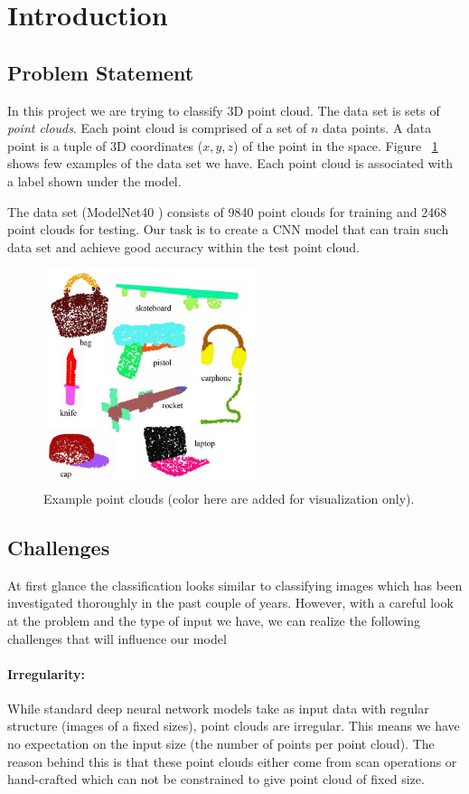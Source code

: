 \section{Introduction} 
\subsection{Problem Statement}

In this project we are trying to classify 3D point cloud. The data set is sets of \emph{point clouds}. Each point cloud is comprised of a set of $n$ data points. A data point is a tuple of 3D coordinates ($x,y,z$) of the point in the space. Figure ~\ref{fig:ex} shows few examples of the data set we have. Each point cloud is associated with a label shown under the model. 


The data set (ModelNet40 \citep{wu20153d}) consists of 9840 point clouds for training and 2468 point clouds for testing. Our task is to create a CNN model that can train such data set and achieve good accuracy within the test point cloud. 

\begin{figure}[hbt]
\includegraphics[height=2.5in, width=2.5in]{fig/ex.JPG}
\caption{Example point clouds (color here are added for visualization only).}
\label{fig:ex}
\end{figure}


\subsection{Challenges}
At first glance the classification looks similar to classifying images which has been investigated thoroughly in the past couple of years. However, with a careful look at the problem and the type of input we have, we can realize the following challenges that will influence our model
\paragraph{Irregularity:}
While standard deep neural network models take as input data with regular structure (images of a fixed sizes), point clouds are irregular. This means we have no expectation on the input size (the number of points per point cloud). The reason behind this is that these point clouds either come from scan operations or hand-crafted which can not be constrained to give point cloud of fixed size.

